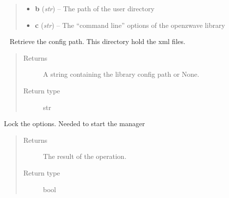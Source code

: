 \documentclass[letterpaper,10pt,english]{sphinxmanual}
\begin{document}
\begin{fulllineitems}
\begin{fulllineitems}
\begin{quote}
\begin{description}
\begin{itemize}
\item {} 
\textbf{b} (\emph{str}) -- The path of the user directory

\item {} 
\textbf{c} (\emph{str}) -- The ``command line'' options of the openzwave library

\end{itemize}

\end{description}\end{quote}

\end{fulllineitems}


\begin{fulllineitems}
\label{libopenzwave:libopenzwave.PyOptions.getConfigPath}~\label{libopenzwave:getconfigpath}
Retrieve the config path. This directory hold the xml files.
\begin{quote}\begin{description}
\item[{Returns}] \leavevmode
A string containing the library config path or None.

\item[{Return type}] \leavevmode
str

\end{description}\end{quote}

\end{fulllineitems}


\begin{fulllineitems}
\label{libopenzwave:libopenzwave.PyOptions.lock}
Lock the options. Needed to start the manager
\begin{quote}\begin{description}
\item[{Returns}] \leavevmode
The result of the operation.

\item[{Return type}] \leavevmode
bool

\end{description}\end{quote}

\end{fulllineitems}


\end{fulllineitems}
\end{document}
